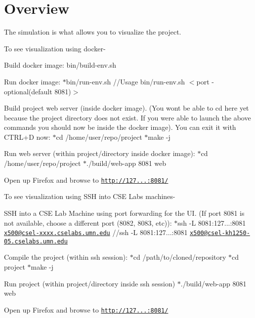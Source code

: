 \hypertarget{simulation_description_Simulation}{}\section{Overview}\label{simulation_description_Simulation}
The simulation is what allows you to visualize the project.

To see visualization using docker-\/
\begin{DoxyEnumerate}
\item Build docker image\+: bin/build-\/env.\+sh
\item Run docker image\+: $\ast$bin/run-\/env.sh //\+Usage bin/run-\/env.\+sh $<$port -\/ optional(default 8081)$>$
\item Build project web server (inside docker image). (You won\textquotesingle{}t be able to cd here yet because the project directory does not exist. If you were able to launch the above commands you should now be inside the docker image). You can exit it with C\+T\+R\+L+D now\+: $\ast$cd /home/user/repo/project $\ast$make -\/j
\item Run web server (within project/directory inside docker image)\+: $\ast$cd /home/user/repo/project $\ast$./build/web-\/app 8081 web
\item Open up Firefox and browse to \href{http://127.0.0.1:8081/}{\tt http\+://127...\+:8081/}
\end{DoxyEnumerate}

To see visualization using S\+SH into C\+SE Labs machines-\/
\begin{DoxyEnumerate}
\item S\+SH into a C\+SE Lab Machine using port forwarding for the UI. (If port 8081 is not available, choose a different port (8082, 8083, etc))\+: $\ast$ssh -\/L 8081\+:127...\+:8081 \href{mailto:x500@csel-xxxx.cselabs.umn.edu}{\tt x500@csel-\/xxxx.\+cselabs.\+umn.\+edu} //ssh -\/L 8081\+:127...\+:8081 \href{mailto:x500@csel-kh1250-05.cselabs.umn.edu}{\tt x500@csel-\/kh1250-\/05.\+cselabs.\+umn.\+edu}
\item Compile the project (within ssh session)\+: $\ast$cd /path/to/cloned/repository $\ast$cd project $\ast$make -\/j
\item Run project (within project/directory inside ssh session) $\ast$./build/web-\/app 8081 web
\item Open up Firefox and browse to \href{http://127.0.0.1:8081/}{\tt http\+://127...\+:8081/}
\end{DoxyEnumerate}

